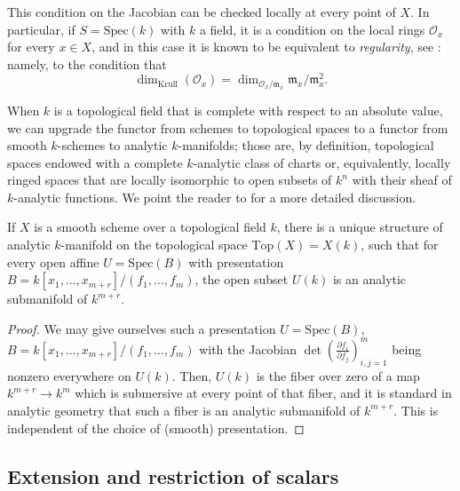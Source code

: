 This condition on the Jacobian can be checked locally at every point of $X$. In particular, if $S=\text{Spec}(k)$ with $k$ a field, it is a condition on the local rings $\mathcal O_x$ for every $x\in X$, and in this case it is known to be equivalent to \emph{regularity}, see \cite[\href{https://stacks.math.columbia.edu/tag/00TV}{Tag 00TV}]{stacks-project}: namely, to the condition that 
\begin{equation}
\label{equation-regularlocalring}
\dim_{\text{Krull}}(\mathcal O_x) = \dim_{\mathcal O_x/\mathfrak m_x} \mathfrak m_x/\mathfrak m_x^2.
\end{equation}


When $k$ is a topological field that is complete with respect to an absolute value, we can upgrade the functor from schemes to topological spaces to a functor from smooth $k$-schemes to analytic $k$-manifolds; those are, by definition, topological spaces endowed with a complete $k$-analytic class of charts or, equivalently, locally ringed spaces that are locally isomorphic to open subsets of $k^n$ with their sheaf of $k$-analytic functions. We point the reader to \cite{Serre-Lie} for a more detailed discussion.


\begin{proposition}
\label{proposition-smooth-schemes-to-manifolds}
If $X$ is a smooth scheme over a topological field $k$, there is a unique structure of analytic $k$-manifold on the topological space $\text{Top}(X)=X(k)$, such that for every open affine $U=\text{Spec}(B)$ with presentation $B=k[x_1, \dots, x_{m+r}]/(f_1, \dots, f_m)$, the open subset $U(k)$ is an analytic submanifold of $k^{m+r}$.
\end{proposition}

\begin{proof}
 We may give ourselves such a presentation $U=\text{Spec}(B)$, $B=k[x_1, \dots, x_{m+r}]/(f_1, \dots, f_m)$ with the Jacobian $\det \left( \frac{\partial f_i}{\partial f_j} \right)_{i, j=1}^m$ being nonzero everywhere on $U(k)$. Then, $U(k)$ is the fiber over zero of a map $k^{m+r}\to k^m$ which is submersive at every point of that fiber, and it is standard in analytic geometry that such a fiber is an analytic submanifold of $k^{m+r}$. This is independent of the choice of (smooth) presentation.
\end{proof}


\subsection{Extension and restriction of scalars}
\label{subsection-extension-restriction-of-scalars}




